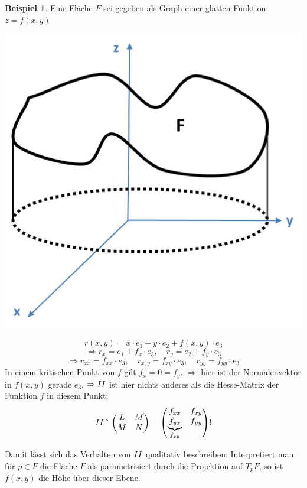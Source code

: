 \documentclass[a4paper,11pt,notitlepage]{report}
\theoremstyle{definition}
\newtheorem{example}{Beispiel}[chapter]
\newcommand{\RM}[1]{\MakeUppercase{\romannumeral #1{}}}
\begin{document}
\begin{example}
	Eine Fläche $F$ sei gegeben als Graph einer glatten Funktion $z = f(x,y)$	
	\begin{center}
		\includegraphics[scale=0.4]{images/2012_01_26_Bild3.jpg}
	\end{center}
	$$r(x,y) = x \cdot e_1 + y \cdot e_2 + f(x,y) \cdot e_3$$
	$$\Rightarrow r_x = e_1 + f_x \cdot e_3, \quad r_y = e_2 + f_y \cdot e_3$$
	$$\Rightarrow r_{xx} = f_{xx} \cdot e_3, \quad r_{x,y} = f_{xy} \cdot e_3, \quad r_{yy} = f_{yy} \cdot e_3$$
	In einem \underline{kritischen} Punkt von $f$ gilt $f_x = 0 = f_y$. \newline
	$\Rightarrow$ hier ist der Normalenvektor in $f(x,y)$ gerade $e_3$. \newline
	$\Rightarrow \RM{2}$ ist hier nichts anderes als die Hesse-Matrix der Funktion $f$ in diesem Punkt:
	$$\RM{2} \hat{=} \begin{pmatrix}
	L & M \\ M & N
	\end{pmatrix} = \begin{pmatrix} f_{xx} & f_{xy} \\ \underbrace{f_{yx}}_{f_{xy}} & f_{yy} \end{pmatrix} !$$
	
	Damit lässt sich das Verhalten von $\RM{2}$ qualitativ beschreiben: \newline
	Interpretiert man für $p \in F$ die Fläche $F$ als parametrisiert durch die Projektion auf $T_p F$, so ist $f(x,y)$ die Höhe über dieser Ebene.
	

\end{example}
\end{document}
